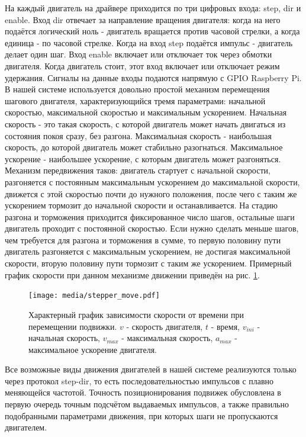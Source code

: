 \documentclass[14pt,russian,a4paper]{extarticle}
\newcommand{\gb}[1]{\guillemotleft #1\guillemotright}
\begin{document}
На каждый двигатель на драйвере приходится по три цифровых входа: \gb{step}, \gb{dir}  и \gb{enable}. Вход \gb{dir} отвечает за направление вращения двигателя: когда на него подаётся логический ноль - двигатель вращается против часовой стрелки, а когда единица - по часовой стрелке. Когда на вход \gb{step} подаётся импульс - двигатель делает один шаг. Вход \gb{enable} включает или отключает ток через обмотки двигателя. Когда двигатель стоит, этот вход включает или отключает режим удержания. Сигналы на данные входы подаются напрямую с GPIO Raspberry Pi.
\newline
В нашей системе используется довольно простой механизм перемещения шагового двигателя, характеризующийся тремя параметрами: начальной скоростью, максимальной скоростью и максимальным ускорением. Начальная скорость - это такая скорость, с которой двигатель может начать двигаться из состояния покоя сразу, без разгона. Максимальная скорость - наибольшая скорость, до которой двигатель может стабильно разогнаться. Максимальное ускорение - наибольшее ускорение, с которым двигатель может разгоняться. Механизм передвижения таков: двигатель стартует с начальной скорости, разгоняется с постоянным максимальным ускорением до максимальной скорости, движется с этой скоростью почти до нужного положения, после чего с таким же ускорением тормозит до начальной скорости и останавливается. На стадию разгона и торможения приходится фиксированное число шагов, остальные шаги двигатель проходит с постоянной скоростью. Если нужно сделать меньше шагов, чем требуется для разгона и торможения в сумме, то первую половину пути двигатель разгоняется с максимальным ускорением, не достигая максимальной скорости, вторую половину пути тормозит с таким же ускорением.
Примерный график скорости при данном механизме движении приведён на рис. \ref{fig:stepper_move}.

\begin{figure}[h!]
    \centerline{\texttt{[image: media/stepper\_move.pdf]}}
    \caption{Характерный график зависимости скорости от времени при перемещении подвижки. $v$ - скорость двигателя, $t$ - время, $v_{ini}$ - начальная скорость, $v_{max}$ - максимальная скорость, $a_{max}$ - максимальное ускорение двигателя.}
    \label{fig:stepper_move}
\end{figure}

Все возможные виды движения двигателей в нашей системе реализуются только через протокол \gb{step-dir}, то есть последовательностью импульсов с плавно меняющейся частотой. Точность позиционирования подвижек обусловлена в первую очередь точным подсчётом выдаваемых импульсов, а также правильно подобранными параметрами движения, при которых шаги не пропускаются двигателем.
\end{document}
